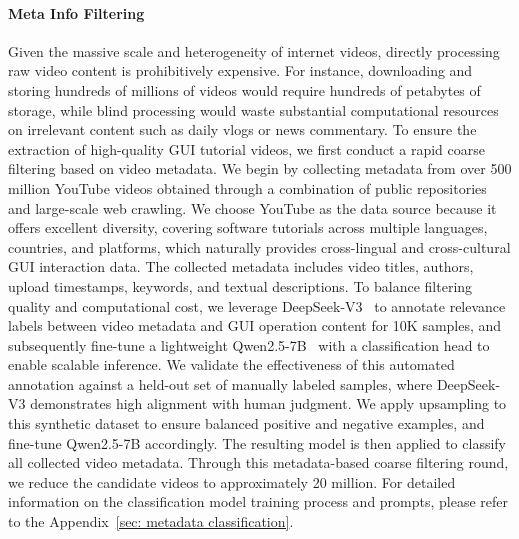 \documentclass{article}
\theoremstyle{plain}
\theoremstyle{definition}
\theoremstyle{remark}
\begin{document}
\paragraph{Meta Info Filtering}
Given the massive scale and heterogeneity of internet videos, directly processing raw video content is prohibitively expensive. For instance, downloading and storing hundreds of millions of videos would require hundreds of petabytes of storage, while blind processing would waste substantial computational resources on irrelevant content such as daily vlogs or news commentary. 
To ensure the extraction of high-quality GUI tutorial videos, we first conduct a rapid coarse filtering based on video metadata. We begin by collecting metadata from over 500 million YouTube videos obtained through a combination of public repositories and large-scale web crawling. We choose YouTube as the data source because it offers excellent diversity, covering software tutorials across multiple languages, countries, and platforms, which naturally provides cross-lingual and cross-cultural GUI interaction data. The collected metadata includes video titles, authors, upload timestamps, keywords, and textual descriptions.
To balance filtering quality and computational cost, we leverage DeepSeek-V3~\citep{liu2024deepseek} to annotate relevance labels between video metadata and GUI operation content for 10K samples, and subsequently fine-tune a lightweight Qwen2.5-7B~\citep{Yang2024Qwen25TR} with a classification head to enable scalable inference.
We validate the effectiveness of this automated annotation against a held-out set of manually labeled samples, where DeepSeek-V3 demonstrates high alignment with human judgment. 
We apply upsampling to this synthetic dataset to ensure balanced positive and negative examples, and fine-tune Qwen2.5-7B accordingly. 
The resulting model is then applied to classify all collected video metadata. Through this metadata-based coarse filtering round, we reduce the candidate videos to approximately 20 million. For detailed information on the classification model training process and prompts, please refer to the Appendix~\ref{sec: metadata classification}.
\end{document}
